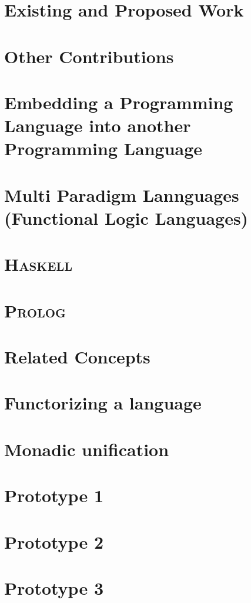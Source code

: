 \documentclass{beamer}
\newcommand{\progLang}[1]{\textsc{#1}}
\begin{document}
\section{Existing and Proposed Work}

\section{Other Contributions}

\section{Embedding a Programming Language into another Programming Language}

\section{Multi Paradigm Lannguages (Functional Logic Languages)}

\section{\progLang{Haskell}}

\section{\progLang{Prolog}}

\section{Related Concepts}

\section{Functorizing a language}
\section{Monadic unification}
\section{Prototype 1}
\section{Prototype 2}
\section{Prototype 3}
\end{document}
